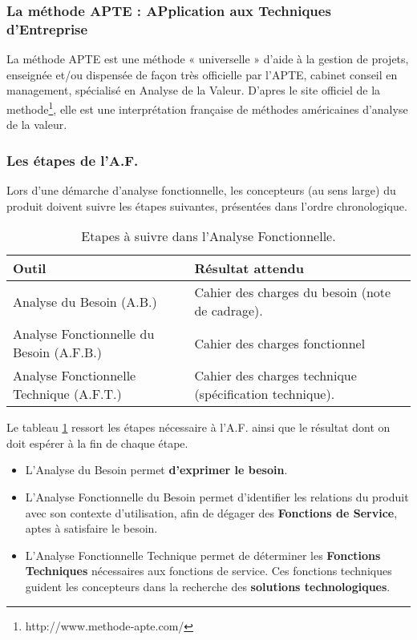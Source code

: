 \subsubsection{La méthode APTE : \textbf{AP}plication aux \textbf{T}echniques d’\textbf{E}ntreprise}
La méthode APTE est une méthode « universelle » d’aide à la gestion de projets, enseignée et/ou dispensée de façon très officielle par l’APTE, cabinet conseil en management, spécialisé en Analyse de la Valeur. D'apres le site officiel de la methode\footnote{http://www.methode‐apte.com/}, elle est une interprétation française de méthodes américaines d’analyse de la valeur.

\subsubsection{Les étapes de l’A.F.}
Lors d’une démarche d’analyse fonctionnelle, les concepteurs (au sens large) du produit doivent suivre les étapes suivantes, présentées dans l’ordre chronologique.
\begin{table}[H]
    \centering
    \caption{Etapes à suivre dans l'Analyse Fonctionnelle.}
    \begin{tabular}[t]{|p{6cm}|p{9cm}|} 
        \hline
        \textbf{Outil} & \textbf{Résultat attendu}\\
        \hline\hline
        Analyse du Besoin (A.B.) & Cahier des charges du besoin (note de
        cadrage). \\
        \hline
        Analyse Fonctionnelle du Besoin (A.F.B.) & Cahier des charges fonctionnel \\
        \hline
        Analyse Fonctionnelle Technique (A.F.T.) & Cahier des charges technique (spécification
        technique).\\
        \hline\hline
    \end{tabular}
    \label{tab:etapesaf}
\end{table}%

Le tableau \ref{tab:etapesaf} ressort les étapes nécessaire à l'A.F. ainsi que le résultat dont on doit espérer à la fin de chaque étape.
\begin{itemize}
    \item L’Analyse du Besoin permet \textbf{d’exprimer le besoin}.
    \item L’Analyse Fonctionnelle du Besoin permet d’identifier les relations du produit avec son contexte d’utilisation, afin de dégager des \textbf{Fonctions de Service}, aptes à satisfaire le besoin.
    \item L’Analyse Fonctionnelle Technique permet de déterminer les \textbf{Fonctions Techniques} nécessaires aux fonctions de service. Ces fonctions techniques guident les concepteurs dans la recherche des \textbf{solutions technologiques}.
\end{itemize}
